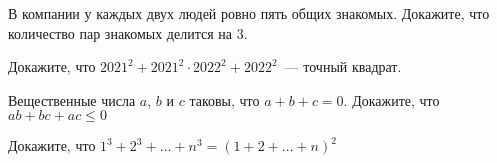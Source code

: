 \documentclass{article}
\begin{document}
\begin{enumerate_boxed}
        \item В компании у каждых двух людей ровно пять общих знакомых.
        Докажите, что количество пар знакомых делится на 3.

        \item Докажите, что $2021^2+2021^2 \cdot 2022^2+2022^2$~--- точный квадрат.

        \item Вещественные числа $a$, $b$ и $c$ таковы, что $a+b+c=0$.
        Докажите, что $ab+bc+ac \le 0$

        \item Докажите, что $1^3 + 2^3 + \dots + n^3 =(1 + 2 + \dots + n) ^ 2$

    \end{enumerate_boxed}
\end{document}
